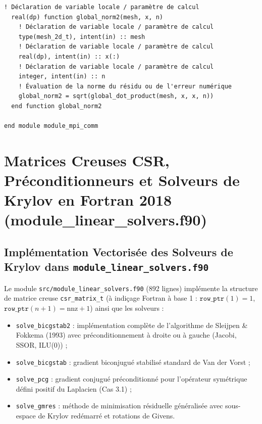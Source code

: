\documentclass[10pt,a4paper,oneside]{book}
\begin{document}
\begin{lstlisting}[language={[95]Fortran}]
  ! Déclaration de variable locale / paramètre de calcul
  real(dp) function global_norm2(mesh, x, n)
    ! Déclaration de variable locale / paramètre de calcul
    type(mesh_2d_t), intent(in) :: mesh
    ! Déclaration de variable locale / paramètre de calcul
    real(dp), intent(in) :: x(:)
    ! Déclaration de variable locale / paramètre de calcul
    integer, intent(in) :: n
    ! Évaluation de la norme du résidu ou de l'erreur numérique
    global_norm2 = sqrt(global_dot_product(mesh, x, x, n))
  end function global_norm2

end module module_mpi_comm

\end{lstlisting}

\chapter{Matrices Creuses CSR, Préconditionneurs et Solveurs de Krylov en Fortran 2018 (module_linear_solvers.f90)}
\section{Implémentation Vectorisée des Solveurs de Krylov dans \texttt{module\_linear\_solvers.f90}}
Le module \texttt{src/module\_linear\_solvers.f90} (892 lignes) implémente la structure de matrice creuse \texttt{csr\_matrix\_t} (à indiçage Fortran à base 1 : $\texttt{row\_ptr}(1) = 1$, $\texttt{row\_ptr}(n+1) = \text{nnz} + 1$) ainsi que les solveurs :
\begin{itemize}
  \item \texttt{solve\_bicgstab2} : implémentation complète de l'algorithme de Sleijpen \& Fokkema (1993) avec préconditionnement à droite ou à gauche (Jacobi, SSOR, ILU(0)) ;
  \item \texttt{solve\_bicgstab} : gradient biconjugué stabilisé standard de Van der Vorst ;
  \item \texttt{solve\_pcg} : gradient conjugué préconditionné pour l'opérateur symétrique défini positif du Laplacien (Cas 3.1) ;
  \item \texttt{solve\_gmres} : méthode de minimisation résiduelle généralisée avec sous-espace de Krylov redémarré et rotations de Givens.
\end{itemize}
\end{document}
